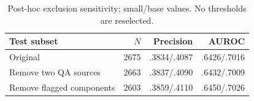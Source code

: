 \begin{table}[t]
\caption{Post-hoc exclusion sensitivity; small/base values. No thresholds are reselected.}
\label{tab:sensitivity}\centering\footnotesize
\begin{tabular}{lrrr}\toprule
Test subset & $N$ & Precision & AUROC\\\midrule
Original & 2675 & .3834/.4087 & .6426/.7016\\
Remove two QA sources & 2663 & .3837/.4090 & .6432/.7009\\
Remove flagged components & 2603 & .3859/.4110 & .6450/.7026\\\bottomrule
\end{tabular}
\end{table}
